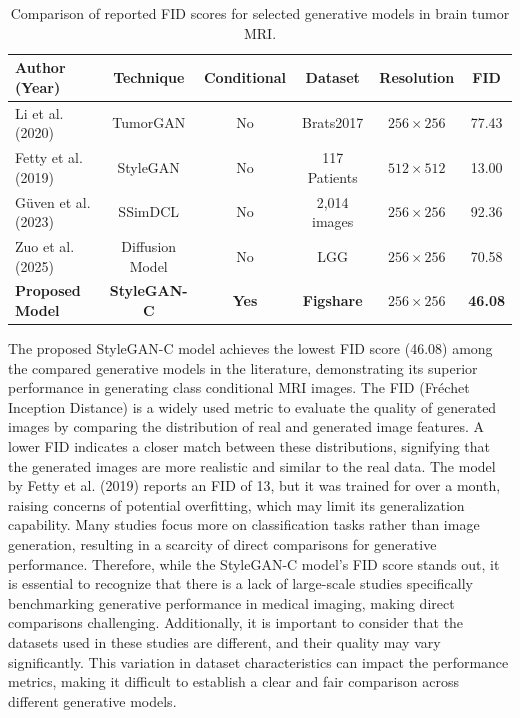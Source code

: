 \begin{table}[H]
\centering
\small
\caption{Comparison of reported FID scores for selected generative models in brain tumor MRI.}
\label{tab:generative_models_fid_only}
\begin{tabular}{lccccc}
\toprule
Author (Year) & Technique & Conditional & Dataset & Resolution & FID \\
\midrule
Li et al. (2020) \cite{li2020tumorgan}        & TumorGAN     & No  & Brats2017  & $256 \times 256$  & 77.43 \\
Fetty et al. (2019) \cite{Fetty2020}         & StyleGAN    & No  & 117 Patients         & $512 \times 512$  & 13.00 \\
Güven et al. (2023) \cite{Guven2023BrainMRI} & SSimDCL    & No  & 2,014 images           & $256 \times 256$  & 92.36 \\
Zuo et al. (2025) \cite{zuo2025multichannel} & Diffusion Model    & No  & LGG    & $256 \times 256$                 & 70.58 \\
\midrule
\textbf{Proposed Model}         & \textbf{StyleGAN-C}   & \textbf{Yes}  & \textbf{Figshare}              & \textbf{$256 \times 256$}  & \textbf{46.08} \\
\bottomrule
\end{tabular}
\end{table}

The proposed StyleGAN-C model achieves the lowest FID score (46.08) among the compared generative models in the literature, demonstrating its superior performance in generating class conditional MRI images. The FID (Fréchet Inception Distance) is a widely used metric to evaluate the quality of generated images by comparing the distribution of real and generated image features. A lower FID indicates a closer match between these distributions, signifying that the generated images are more realistic and similar to the real data. The model by Fetty et al. (2019) reports an FID of 13, but it was trained for over a month, raising concerns of potential overfitting, which may limit its generalization capability. Many studies focus more on classification tasks rather than image generation, resulting in a scarcity of direct comparisons for generative performance. Therefore, while the StyleGAN-C model's FID score stands out, it is essential to recognize that there is a lack of large-scale studies specifically benchmarking generative performance in medical imaging, making direct comparisons challenging. Additionally, it is important to consider that the datasets used in these studies are different, and their quality may vary significantly. This variation in dataset characteristics can impact the performance metrics, making it difficult to establish a clear and fair comparison across different generative models.



